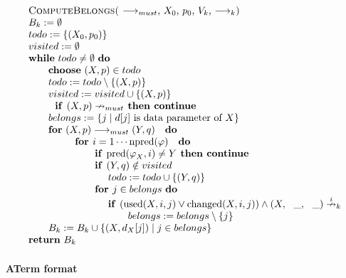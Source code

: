 \documentclass{article}
\begin{document}
\begin{equation*}
\begin{tabular}{l}
\textsc{ComputeBelongs(} $\longrightarrow _{must}$, $X_{0}$, $p_{0}$, $V_{k}$%
, $\longrightarrow _{k}$\textsc{)} \\ 
$B_{k}:=\emptyset $ \\ 
$todo:=\{(X_{0},p_{0})\}$ \\ 
$visited:=\emptyset $ \\ 
\textbf{while} $todo\neq \emptyset $ \textbf{do} \\ 
$\qquad $\textbf{choose} $(X,p)\in todo$ \\ 
$\qquad todo:=todo\setminus \{(X,p)\}$ \\ 
$\qquad visited:=visited\cup \{(X,p)\}$ \\ 
$\qquad \text{\textbf{if }}(X,p)\nrightarrow _{must}$\textbf{\ then continue}
\\ 
$\qquad belongs:=\{j\mid d[j]$ is data parameter of $X\}$ \\ 
$\qquad $\textbf{for} $(X,p)\longrightarrow _{must}(Y,q)\text{ \textbf{do}}$
\\ 
$\qquad \qquad \text{\textbf{for }}i=1\cdots \mathrm{npred}(\varphi )\text{ 
\textbf{do}}$ \\ 
$\qquad \qquad \qquad \text{\textbf{if }}\mathrm{pred}(\varphi _{X},i)\neq Y$%
\textbf{\ then continue} \\ 
$\qquad \qquad \qquad \text{\textbf{if }}(Y,q)\notin visited$ \\ 
$\qquad \qquad \qquad \qquad todo:=todo\cup \{(Y,q)\}$ \\ 
$\qquad \qquad \qquad \text{\textbf{for }}j\in belongs$ \textbf{do} \\ 
$\qquad \qquad \qquad \qquad $\textbf{if }$(\mathrm{used}(X,i,j)\vee \mathrm{%
changed}(X,i,j))\wedge (X,\_,\_)\overset{i}{\nrightarrow }_{k}$ \\ 
$\qquad \qquad \qquad \qquad \qquad belongs:=belongs\setminus \{j\}$ \\ 
$\qquad B_{k}:=B_{k}\cup \{(X,d_{X}[j])\mid j\in belongs\}$ \\ 
\textbf{return} $B_{k}$%
\end{tabular}%
\end{equation*}

\newpage

\appendix

\paragraph{ATerm format}
\end{document}
